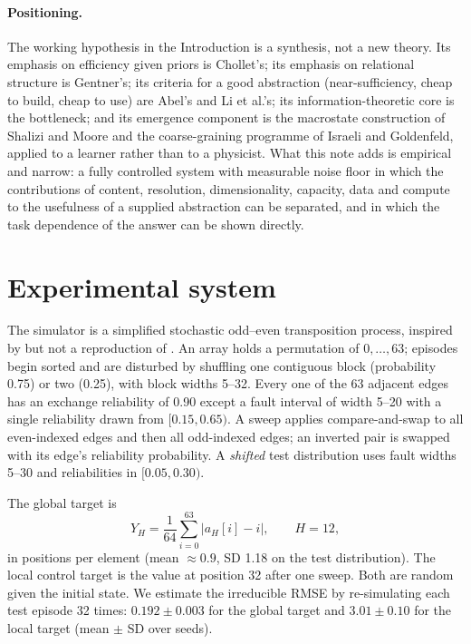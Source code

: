 \documentclass[11pt,a4paper]{article}
\begin{document}
\paragraph{Positioning.}
The working hypothesis in the Introduction is a synthesis, not a new theory.
Its emphasis on efficiency given priors is Chollet's; its emphasis on
relational structure is Gentner's; its criteria for a good abstraction
(near-sufficiency, cheap to build, cheap to use) are Abel's and Li et al.'s;
its information-theoretic core is the bottleneck; and its emergence component
is the macrostate construction of Shalizi and Moore and the coarse-graining
programme of Israeli and Goldenfeld, applied to a learner rather than to a
physicist. What this note adds is
empirical and narrow: a fully controlled system with measurable noise floor in
which the contributions of content, resolution, dimensionality, capacity, data
and compute to the usefulness of a supplied abstraction can be separated, and
in which the task dependence of the answer can be shown directly.

\section{Experimental system}

The simulator is a simplified stochastic odd--even transposition process,
inspired by but not a reproduction of \citet{zhang2025}. An array holds a
permutation of $0,\ldots,63$; episodes begin sorted and are disturbed by
shuffling one contiguous block (probability 0.75) or two (0.25), with block
widths 5--32. Every one of the 63 adjacent edges has an exchange reliability of
0.90 except a fault interval of width 5--20 with a single reliability drawn from
$[0.15,0.65)$. A sweep applies compare-and-swap to all even-indexed edges and
then all odd-indexed edges; an inverted pair is swapped with its edge's
reliability probability. A \emph{shifted} test distribution uses fault widths
5--30 and reliabilities in $[0.05,0.30)$.

The global target is
\begin{equation}
  Y_H=\frac{1}{64}\sum_{i=0}^{63}\lvert a_H[i]-i\rvert,\qquad H=12,
\end{equation}
in positions per element (mean $\approx 0.9$, SD 1.18 on the test
distribution). The local control target is the value at position 32 after one
sweep. Both are random given the initial state. We estimate the irreducible RMSE
by re-simulating each test episode 32 times: $0.192\pm0.003$ for the global
target and $3.01\pm0.10$ for the local target (mean $\pm$ SD over seeds).
\end{document}
